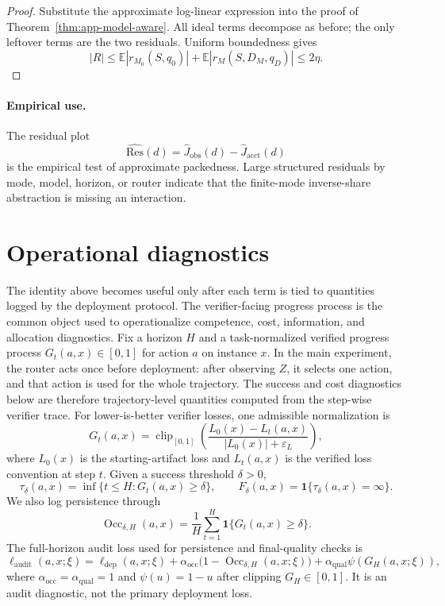 \documentclass{article}
\DeclareMathOperator{\Occ}{Occ}
\newcommand{\E}{\mathbb{E}}
\newcommand{\eps}{\varepsilon}
\newcommand{\one}{\mathbf{1}}
\begin{document}
\begin{proof}
Substitute the approximate log-linear expression into the proof of
Theorem~\ref{thm:app-model-aware}.  All ideal terms decompose as before; the only leftover
terms are the two residuals.  Uniform boundedness gives
\[
    |R|
    \le
    \E|r_{M_0}(S,q_0)|+\E|r_M(S,D_M,q_D)|
    \le 2\eta.
\]
\end{proof}

\paragraph{Empirical use.}
The residual plot
\[
    \widehat{\mathrm{Res}}(d)
    =
    \widehat J_{\mathrm{obs}}(d)-\widehat J_{\mathrm{acct}}(d)
\]
is the empirical test of approximate packedness.
Large structured residuals by mode, model, horizon, or router indicate that the finite-mode
inverse-share abstraction is missing an interaction.


\section{Operational diagnostics}
\label{subsec:bridge}

The identity above becomes useful only after each term is tied to quantities logged by the deployment protocol.
The verifier-facing progress process is the common object used to operationalize competence, cost, information, and allocation diagnostics.
Fix a horizon $H$ and a task-normalized verified progress process $G_t(a,x)\in[0,1]$ for action $a$ on instance $x$.
In the main experiment, the router acts once before deployment: after observing $Z$, it selects one action, and that action is used for the whole trajectory.
The success and cost diagnostics below are therefore trajectory-level quantities computed from the step-wise verifier trace.
For lower-is-better verifier losses, one admissible normalization is
\[
G_t(a,x)
=
\operatorname{clip}_{[0,1]}\!\left(
\frac{L_0(x)-L_t(a,x)}{|L_0(x)|+\eps_L}
\right),
\]
where $L_0(x)$ is the starting-artifact loss and $L_t(a,x)$ is the verified loss convention at step $t$.
Given a success threshold $\delta>0$,
\[
\tau_\delta(a,x)=\inf\{t\le H:G_t(a,x)\ge \delta\},
\qquad
F_\delta(a,x)=\one\{\tau_\delta(a,x)=\infty\}.
\]
We also log persistence through
\[
\Occ_{\delta,H}(a,x)=\frac{1}{H}\sum_{t=1}^H \one\{G_t(a,x)\ge \delta\}.
\]
The full-horizon audit loss used for persistence and final-quality checks is
\begin{equation}
\ell_{\mathrm{audit}}(a,x;\xi)
=
\ell_{\mathrm{dep}}(a,x;\xi)
+\alpha_{\mathrm{occ}}\bigl(1-\Occ_{\delta,H}(a,x;\xi)\bigr)
+\alpha_{\mathrm{qual}}\psi(G_H(a,x;\xi)),
\label{eq:audit-loss}
\end{equation}
where \(\alpha_{\mathrm{occ}}=\alpha_{\mathrm{qual}}=1\) and \(\psi(u)=1-u\) after clipping \(G_H\in[0,1]\).
It is an audit diagnostic, not the primary deployment loss.
\end{document}
